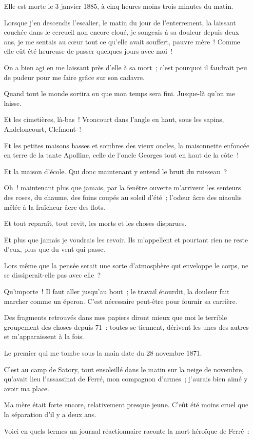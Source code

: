\documentclass[french,twoside]{book} %
\newcommand{\astertri}{\medskip\par\centerline{\color{rubric}\large\selectfont{\syms ✻\,✻\,✻}}\medskip\par}%
\begin{document}
\bigbreak
\noindent Elle est morte le 3 janvier 1885, à cinq heures moins trois minutes du matin.\par
Lorsque j’en descendis l’escalier, le matin du jour de l’enterrement, la laissant couchée dans le cercueil non encore cloué, je songeais à sa douleur depuis deux ans, je me sentais au cœur tout ce qu’elle avait souffert, pauvre mère ! Comme elle eût été heureuse de passer quelques jours avec moi !\par
On a bien agi en me laissant près d’elle à sa mort ; c’est pourquoi il faudrait peu de pudeur pour me faire grâce sur son cadavre.\par
 Quand tout le monde sortira ou que mon temps sera fini. Jusque-là qu’on me laisse.\par
\bigbreak

\astertri

\bigbreak
\noindent Et les cimetières, là-bas ! Vroncourt dans l’angle en haut, sous les sapins, Andeloncourt, Clefmont !\par
Et les petites maisons basses et sombres des vieux oncles, la maisonnette enfoncée en terre de la tante Apolline, celle de l’oncle Georges tout en haut de la côte !\par
Et la maison d’école. Qui donc maintenant y entend le bruit du ruisseau ?\par
Oh ! maintenant plus que jamais, par la fenêtre ouverte m’arrivent les senteurs des roses, du chaume, des foins coupés au soleil d’été ; l’odeur âcre des niaoulis mêlée à la fraîcheur âcre des flots.\par
Et tout reparaît, tout revit, les morts et les choses disparues.\par
Et plus que jamais je voudrais les revoir. Ils m’appellent et pourtant rien ne reste d’eux, plus que du vent qui passe.\par
Lors même que la pensée serait une sorte d’atmosphère qui enveloppe le corps, ne se dissiperait-elle pas avec elle ?\par
Qu’importe ! Il faut aller jusqu’au bout ; le travail  étourdit, la douleur fait marcher comme un éperon. C’est nécessaire peut-être pour fournir sa carrière.\par
\bigbreak
\noindent Des fragments retrouvés dans mes papiers diront mieux que moi le terrible groupement des choses depuis 71 : toutes se tiennent, dérivent les unes des autres et m’apparaissent à la fois.\par
Le premier qui me tombe sous la main date du 28 novembre 1871.\par
C’est au camp de Satory, tout ensoleillé dans le matin sur la neige de novembre, qu’avait lieu l’assassinat de Ferré, mon compagnon d’armes ; j’aurais bien aimé y avoir ma place.\par
Ma mère était forte encore, relativement presque jeune. C’eût été moins cruel que la séparation d’il y a deux ans.\par
Voici en quels termes un journal réactionnaire raconte la mort héroïque de Ferré :\par
\end{document}
